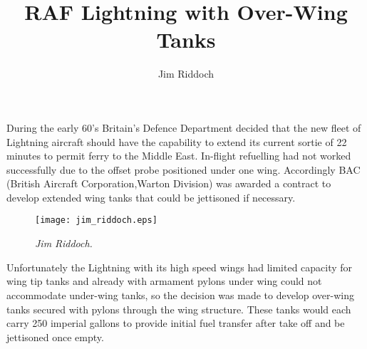 %


\title{RAF Lightning with Over-Wing Tanks}
\author{Jim Riddoch}

\maketitle

During the early 60's Britain's Defence Department decided that the
new fleet of Lightning aircraft should have the capability to extend
its current sortie of 22 minutes to permit ferry to the Middle
East. In-flight refuelling had not worked successfully due to the
offset probe positioned under one wing. Accordingly BAC (British
Aircraft Corporation,Warton Division) was awarded a contract to
develop extended wing tanks that could be jettisoned if necessary.

\begin{figure}[htbp]
   \vspace{2em}
   \centering
   \texttt{[image: jim\_riddoch.eps]}
   \caption*{\small \em Jim Riddoch.}
   \label{fig:jim_riddoch.eps}
\end{figure}



Unfortunately the Lightning with its high speed wings had limited
capacity for wing tip tanks and already with armament pylons under
wing could not accommodate under-wing tanks, so the decision was made
to develop over-wing tanks secured with pylons through the wing
structure. These tanks would each carry 250 imperial gallons to
provide initial fuel transfer after take off and be jettisoned once
empty.

